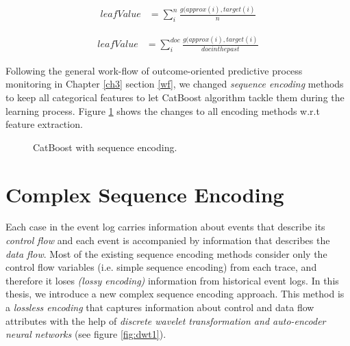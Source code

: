 \begin{equation} \label{eq1}
\begin{split}
leafValue & = \sum_{i}^{n} \frac{g(approx(i), target(i)}{n}   
\end{split}
\end{equation}

\begin{equation} \label{eq2}
\begin{split}
leafValue & = \sum_{i}^{doc} \frac{g(approx(i), target(i)}{doc in the past}   
\end{split}
\end{equation}

Following the general work-flow of outcome-oriented predictive process monitoring in Chapter \ref{ch3} section \ref{wf}, we changed \textit{sequence encoding} methods to keep all categorical features  to let CatBoost algorithm tackle them during the learning process. Figure \ref{fig:cat_enc} shows the changes to all encoding methods w.r.t feature extraction.

\begin{figure}[htb]
	\begin{center}
		\caption{CatBoost with sequence encoding.}
		\label{fig:cat_enc}
	\end{center}
\end{figure}

 


\section{Complex Sequence Encoding} \label{dwt}
Each case in the event log carries information about events that describe its \textit{control flow} and each event is accompanied by information that describes the \textit{data flow}. Most of the existing sequence encoding methods consider only the control flow variables (i.e. simple sequence encoding) from each trace, and therefore it loses \textit{(lossy encoding)} information from historical event logs. In this thesis, we introduce a new complex sequence encoding approach.  This method is a \textit{lossless encoding} that captures information about control and data flow attributes with the help of \textit{discrete wavelet transformation and auto-encoder neural networks} (see figure \ref{fig:dwt1}).

